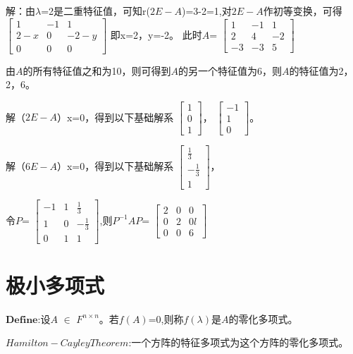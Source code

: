 \documentclass[a4paper,12pt]{book}
\begin{document}
解：由$\lambda$=2是二重特征值，可知r($\mathit{2E-A}$)=3-2=1,对$\mathit{2E-A}$作初等变换，可得
$\begin{bmatrix}
	1& -1 & 1\\
	2-x& 0 &-2-y\\
	 0& 0 &0
\end{bmatrix}$
即x=2，y=-2。
此时$\mathit{A}$=
$\begin{bmatrix}
	1& -1 & 1\\
	2& 4 & -2\\
	-3 &-3  &5
\end{bmatrix}$

由$\mathit{A}$的所有特征值之和为10，则可得到$\mathit{A}$的另一个特征值为6，则$\mathit{A}$的特征值为2，2，6。

解（$\mathit{2E-A}$）x=0，得到以下基础解系
$\begin{bmatrix}
	1\\
	0\\
	1
\end{bmatrix}$，
$\begin{bmatrix}
	-1\\
	1\\
	0
\end{bmatrix}$。

解（$\mathit{6E-A}$）x=0，得到以下基础解系
$\begin{bmatrix}
	\frac{1}{3}\\
	-\frac{1}{3}\\
	1
\end{bmatrix}$，

令$\mathit{P}$=
$\begin{bmatrix}
	-1& 1 & \frac{1}{3}\\
	1& 0 & -\frac{1}{3}\\
	0&1  &1
\end{bmatrix}$,则$\mathit{P^{-1}AP}$=
$\begin{bmatrix}
	2& 0 & 0\\
	0& 2 & 0l  \\
	0&0  &6
\end{bmatrix}$
~\\

\section{极小多项式}

$\mathbf{Define}$:设$\mathit{A}$ $\in$ $\mathit{F^{n\times n} }$。若$\mathit{f(A)}$=0,则称$\mathit{f(\lambda)}$是$\mathit{A}$的零化多项式。

$\mathit{Hamilton-CayleyTheorem}$:一个方阵的特征多项式为这个方阵的零化多项式。
\end{document}
